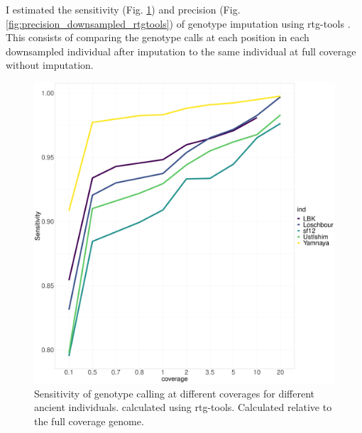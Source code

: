 I estimated the sensitivity (Fig. \ref{fig:Sensitivity_downsampled_rtgtools}) and precision (Fig.  \ref{fig:precision_downsampled_rtgtools}) of genotype imputation using rtg-tools \cite{cleary2014joint}. This consists of comparing the genotype calls at each position in each downsampled individual after imputation to the same individual at full coverage without imputation.

\begin{figure}[htp]
    \centering
    \includegraphics[width=1.0\textwidth]{../images/chapter1/allDownsampled_rtgtools_sensitivity.pdf}
    \caption{Sensitivity of genotype calling at different coverages for different ancient individuals.  calculated using rtg-tools. Calculated relative to the full coverage genome.}
    \label{fig:Sensitivity_downsampled_rtgtools}
\end{figure}

